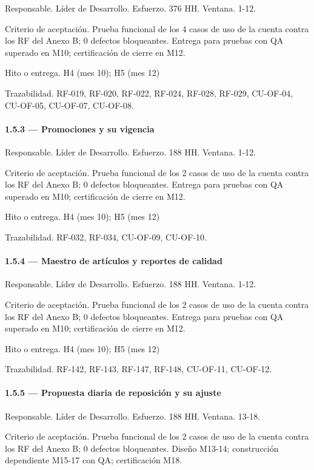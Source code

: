\documentclass[11pt]{article}
\begin{document}
Responsable. Líder de Desarrollo. Esfuerzo. 376 HH. Ventana. 1-12.

Criterio de aceptación. Prueba funcional de los 4 casos de uso de la cuenta contra los RF del Anexo B; 0 defectos bloqueantes. Entrega para pruebas con QA superado en M10; certificación de cierre en M12.

Hito o entrega. H4 (mes 10); H5 (mes 12)

Trazabilidad. RF-019, RF-020, RF-022, RF-024, RF-028, RF-029, CU-OF-04, CU-OF-05, CU-OF-07, CU-OF-08.

\paragraph{1.5.3 — Promociones y su vigencia}

Responsable. Líder de Desarrollo. Esfuerzo. 188 HH. Ventana. 1-12.

Criterio de aceptación. Prueba funcional de los 2 casos de uso de la cuenta contra los RF del Anexo B; 0 defectos bloqueantes. Entrega para pruebas con QA superado en M10; certificación de cierre en M12.

Hito o entrega. H4 (mes 10); H5 (mes 12)

Trazabilidad. RF-032, RF-034, CU-OF-09, CU-OF-10.

\paragraph{1.5.4 — Maestro de artículos y reportes de calidad}

Responsable. Líder de Desarrollo. Esfuerzo. 188 HH. Ventana. 1-12.

Criterio de aceptación. Prueba funcional de los 2 casos de uso de la cuenta contra los RF del Anexo B; 0 defectos bloqueantes. Entrega para pruebas con QA superado en M10; certificación de cierre en M12.

Hito o entrega. H4 (mes 10); H5 (mes 12)

Trazabilidad. RF-142, RF-143, RF-147, RF-148, CU-OF-11, CU-OF-12.

\paragraph{1.5.5 — Propuesta diaria de reposición y su ajuste}

Responsable. Líder de Desarrollo. Esfuerzo. 188 HH. Ventana. 13-18.

Criterio de aceptación. Prueba funcional de los 2 casos de uso de la cuenta contra los RF del Anexo B; 0 defectos bloqueantes. Diseño M13-14; construcción dependiente M15-17 con QA; certificación M18.
\end{document}
